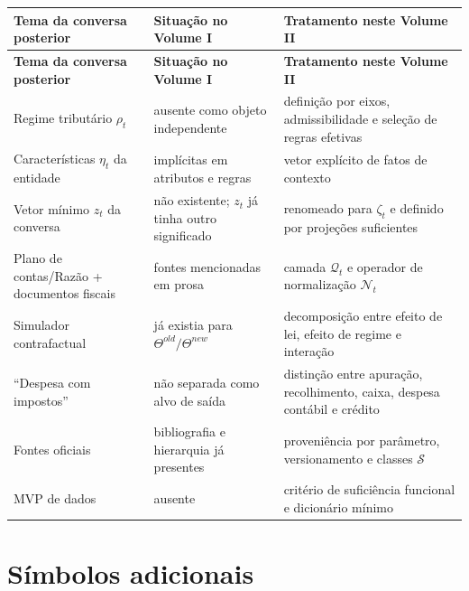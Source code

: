\documentclass[11pt,a4paper]{article}
\newcommand{\cS}{\mathcal{S}}
\newcommand{\cQ}{\mathcal{Q}}
\newcommand{\cN}{\mathcal{N}}
\begin{document}
\begin{longtable}{p{3.6cm}p{4.1cm}p{6.1cm}}
\toprule
\textbf{Tema da conversa posterior} & \textbf{Situação no Volume I} & \textbf{Tratamento neste Volume II}\\
\midrule
\endfirsthead
\toprule
\textbf{Tema da conversa posterior} & \textbf{Situação no Volume I} & \textbf{Tratamento neste Volume II}\\
\midrule
\endhead
Regime tributário $\rho_t$ & ausente como objeto independente & definição por eixos, admissibilidade e seleção de regras efetivas\\
Características $\eta_t$ da entidade & implícitas em atributos e regras & vetor explícito de fatos de contexto\\
Vetor mínimo $z_t$ da conversa & não existente; $z_t$ já tinha outro significado & renomeado para $\zeta_t$ e definido por projeções suficientes\\
Plano de contas/Razão + documentos fiscais & fontes mencionadas em prosa & camada $\cQ_t$ e operador de normalização $\cN_t$\\
Simulador contrafactual & já existia para $\Theta^{old}/\Theta^{new}$ & decomposição entre efeito de lei, efeito de regime e interação\\
``Despesa com impostos'' & não separada como alvo de saída & distinção entre apuração, recolhimento, caixa, despesa contábil e crédito\\
Fontes oficiais & bibliografia e hierarquia já presentes & proveniência por parâmetro, versionamento e classes $\cS$\\
MVP de dados & ausente & critério de suficiência funcional e dicionário mínimo\\
\bottomrule
\end{longtable}

\section{Símbolos adicionais}
\end{document}
